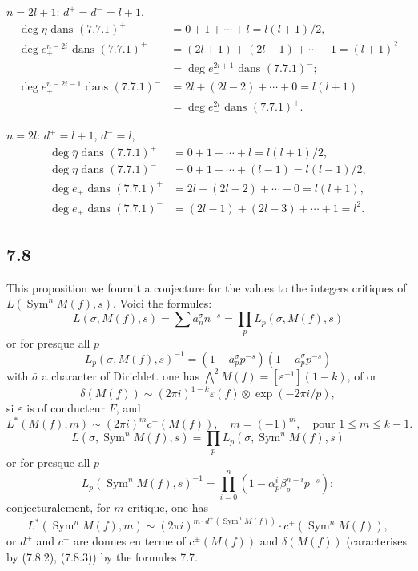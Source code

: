 \documentclass[12pt,a4paper]{article}
\theoremstyle{plain}
\theoremstyle{definition}
\theoremstyle{remark}
\DeclareMathOperator{\Sym}{Sym}
\begin{document}
$n = 2l+1$: $d^+ = d^- = l+1$,
\begin{align*}
\deg \bar{\eta} \text{ dans } (7.7.1)^+ &= 0 + 1 + \cdots + l = l(l+1)/2,\\
\deg e_+^{n-2i} \text{ dans } (7.7.1)^+ &= (2l+1) + (2l-1) + \cdots + 1 = (l+1)^2\\
&= \deg e_-^{2i+1} \text{ dans } (7.7.1)^-;\\
\deg e_+^{n-2i-1} \text{ dans } (7.7.1)^- &= 2l + (2l-2) + \cdots + 0 = l(l+1)\\
&= \deg e_-^{2i} \text{ dans } (7.7.1)^+.
\end{align*}

$n = 2l$: $d^+ = l+1$, $d^- = l$,
\begin{align*}
\deg \bar{\eta} \text{ dans } (7.7.1)^+ &= 0 + 1 + \cdots + l = l(l+1)/2,\\
\deg \bar{\eta} \text{ dans } (7.7.1)^- &= 0 + 1 + \cdots + (l-1) = l(l-1)/2,\\
\deg e_+ \text{ dans } (7.7.1)^+ &= 2l + (2l-2) + \cdots + 0 = l(l+1),\\
\deg e_+ \text{ dans } (7.7.1)^- &= (2l-1) + (2l-3) + \cdots + 1 = l^2.
\end{align*}

\subsection*{7.8}

This proposition we fournit a conjecture for the values to the integers
critiques of $L(\Sym^n M(f), s)$. Voici the formules:
\begin{equation}\label{eq:7.8.1}
L(\sigma, M(f), s) = \sum a_n^\sigma n^{-s} = \prod_p L_p(\sigma, M(f), s)
\end{equation}
or for presque all $p$
\[
L_p(\sigma, M(f), s)^{-1} = (1 - a_p^\sigma p^{-s})(1 - \bar{a}_p^\sigma p^{-s})
\]
with $\bar{\sigma}$ a character of Dirichlet. one has $\bigwedge^2 M(f) = [\varepsilon^{-1}](1-k)$, of or
\begin{equation}\label{eq:7.8.2}
\delta(M(f)) \sim (2\pi i)^{1-k} \varepsilon(f) \otimes \exp(-2\pi i/p),
\end{equation}
si $\varepsilon$ is of conducteur $F$, and
\begin{equation}\label{eq:7.8.3}
L^*(M(f), m) \sim (2\pi i)^m c^+(M(f)), \quad m = (-1)^m, \quad \text{pour } 1 \leq m \leq k-1.
\end{equation}
\begin{equation}\label{eq:7.8.4}
L(\sigma, \Sym^n M(f), s) = \prod_p L_p(\sigma, \Sym^n M(f), s)
\end{equation}
or for presque all $p$
\[
L_p(\Sym^n M(f), s)^{-1} = \prod_{i=0}^n (1 - \alpha_p^i \beta_p^{n-i} p^{-s});
\]
conjecturalement, for $m$ critique, one has
\[
L^*(\Sym^n M(f), m) \sim (2\pi i)^{m \cdot d^+(\Sym^n M(f))} \cdot c^+(\Sym^n M(f)),
\]
or $d^+$ and $c^+$ are donnes en terme of $c^\pm(M(f))$ and $\delta(M(f))$ (caracterises
by (7.8.2), (7.8.3)) by the formules 7.7.
\end{document}
